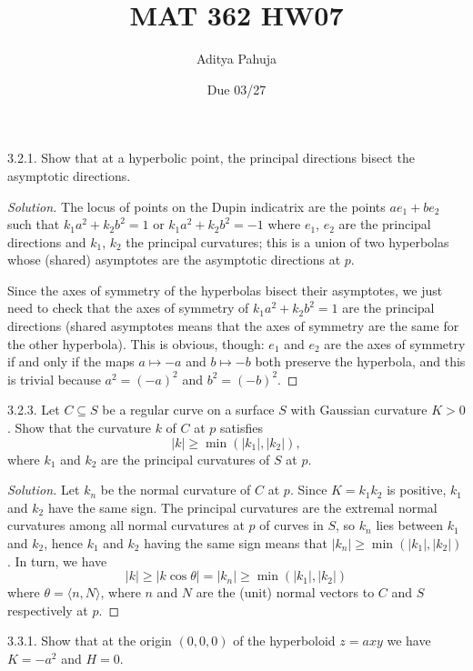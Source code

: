 \documentclass[10pt]{scrartcl}
\title{\vspace{-2em}MAT 362 HW07}
\author{\large Aditya Pahuja}
\date{\large Due 03/27}
\newenvironment{soln}{\begin{proof}[Solution]}{\end{proof}}
\begin{document}
\maketitle

\begin{problem*}3.2.1.
	Show that at a hyperbolic point,
	the principal directions bisect the asymptotic directions.
\end{problem*}

\begin{soln}
	The locus of points on the Dupin indicatrix are the points
	$ae_1 + be_2$ such that $k_1a^2 + k_2b^2 = 1$
	or $k_1a^2 + k_2b^2 = -1$
	where $e_1$, $e_2$ are the principal directions
	and $k_1$, $k_2$ the principal curvatures;
	this is a union of two hyperbolas whose (shared) asymptotes
	are the asymptotic directions at $p$.
	
	Since the axes of symmetry of the hyperbolas
	bisect their asymptotes, we just need to check that
	the axes of symmetry of $k_1a^2 + k_2b^2 = 1$ are the principal directions
	(shared asymptotes means that the axes of symmetry
	are the same for the other hyperbola).
	This is obvious, though: $e_1$ and $e_2$ are the axes of symmetry
	if and only if the maps $a\mapsto -a$ and $b\mapsto -b$
	both preserve the hyperbola, and this is trivial
	because $a^2 = (-a)^2$ and $b^2 = (-b)^2$.
\end{soln}

\begin{problem*}3.2.3.
	Let $C\subseteq S$ be a regular curve on a surface $S$
	with Gaussian curvature $K > 0$.
	Show that the curvature $k$ of $C$ at $p$ satisfies
	\[|k|\ge\min(|k_1|,|k_2|),\]
	where $k_1$ and $k_2$ are the principal curvatures of $S$ at $p$.
\end{problem*}

\begin{soln}
	Let $k_n$ be the normal curvature of $C$ at $p$.
	Since $K = k_1k_2$ is positive, $k_1$ and $k_2$ have the same sign.
	The principal curvatures are the extremal normal curvatures
	among all normal curvatures at $p$ of curves in $S$,
	so $k_n$ lies between $k_1$ and $k_2$,
	hence $k_1$ and $k_2$ having the same sign means that
	$|k_n| \ge\min(|k_1|,|k_2|)$.
	In turn, we have
	\[|k|\ge |k\cos\theta| = |k_n| \ge \min(|k_1|,|k_2|)\]
	where $\theta = \langle n,N\rangle$, where $n$ and $N$ are
	the (unit) normal vectors to $C$ and $S$ respectively at $p$.
\end{soln}

\begin{problem*}3.3.1.
	Show that at the origin $(0,0,0)$ of the hyperboloid $z=axy$
	we have $K = -a^2$ and $H = 0$.
\end{problem*}
\end{document}
